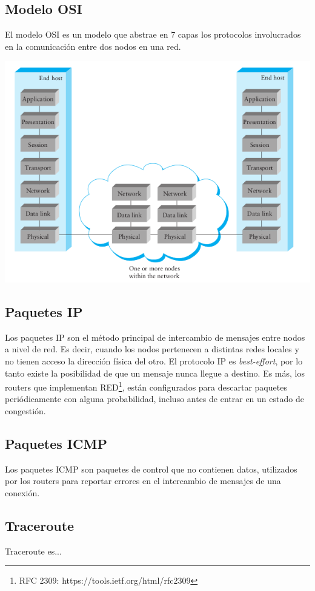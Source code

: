 \subsection{Modelo OSI}

El modelo OSI es un modelo que abstrae en 7 capas los protocolos involucrados en la comunicación entre dos nodos en una red.

\begin{center}
\includegraphics[width=\textwidth]{imgs/osi.png}
\end{center}

\subsection{Paquetes IP}

Los paquetes IP son el método principal de intercambio de mensajes entre nodos a nivel de red. Es decir, cuando los nodos pertenecen a distintas redes locales y no tienen acceso la dirección física del otro. El protocolo IP es \textit{best-effort}, por lo tanto existe la posibilidad de que un mensaje nunca llegue a destino. Es más, los routers que implementan RED\footnote{RFC 2309: https://tools.ietf.org/html/rfc2309}, están configurados para descartar paquetes periódicamente con alguna probabilidad, incluso antes de entrar en un estado de congestión.

\subsection{Paquetes ICMP}

Los paquetes ICMP son paquetes de control que no contienen datos, utilizados por los routers para reportar errores en el intercambio de mensajes de una conexión.

\subsection{Traceroute}

Traceroute es...
